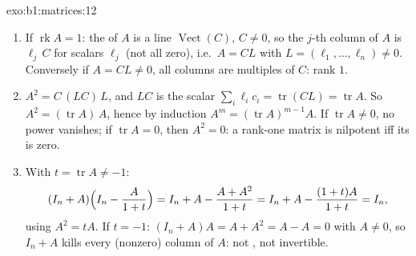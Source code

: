 \begin{solution}{exo:b1:matrices:12}
\begin{enumerate}
  \item If $\operatorname{rk} A = 1$: the  of $A$ is a line
        $\operatorname{Vect}(C)$, $C \neq 0$, so the $j$-th
        column of $A$ is $\ell_j\,C$ for scalars $\ell_j$ (not
        all zero), i.e.\ $A = C L$ with $L = (\ell_1, \dots,
        \ell_n) \neq 0$. Conversely if $A = CL \neq 0$, all
        columns are multiples of $C$: rank $1$.
  \item $A^2 = C\,(L C)\,L$, and $LC$ is the scalar $\sum_i
        \ell_i c_i = \operatorname{tr}(CL) = \operatorname{tr}
        A$. So $A^2 = (\operatorname{tr} A)\,A$, hence by
        induction $A^m = (\operatorname{tr} A)^{m-1} A$. If
        $\operatorname{tr} A \neq 0$, no power vanishes; if
        $\operatorname{tr} A = 0$, then $A^2 = 0$: a rank-one
        matrix is nilpotent iff its  is zero.
  \item With $t = \operatorname{tr} A \neq -1$:
        \[
        (I_n + A)\Bigl(I_n - \frac{A}{1 + t}\Bigr)
        = I_n + A - \frac{A + A^2}{1 + t}
        = I_n + A - \frac{(1 + t)A}{1 + t} = I_n ,
        \]
        using $A^2 = tA$. If $t = -1$: $(I_n + A)A = A + A^2 = A
        - A = 0$ with $A \neq 0$, so $I_n + A$ kills every
        (nonzero) column of $A$: not , not invertible.
\end{enumerate}
\end{solution}

